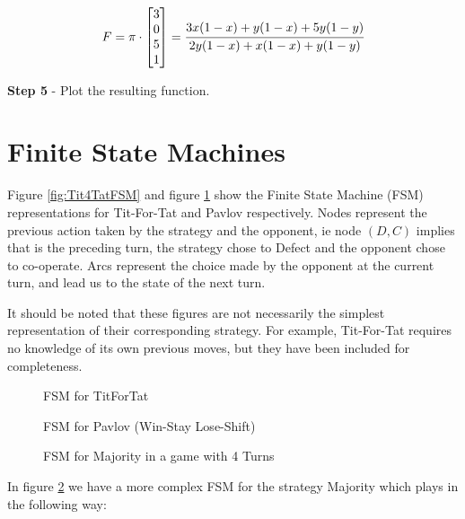 \begin{equation}
F = \pi \cdot
\begin{bmatrix}
3 \\
0 \\
5 \\
1
\end{bmatrix}
=
\cfrac{3x(1-x) + y(1-x) + 5y(1-y)}{2y(1-x) + x(1-x) + y(1-y)}
\end{equation}

\textbf{Step 5} - Plot the resulting function.

\section{Finite State Machines}

Figure \ref{fig:Tit4TatFSM} and figure \ref{fig:PavlovFSM} show the Finite State Machine (FSM) representations for Tit-For-Tat and Pavlov respectively.
Nodes represent the previous action taken by the strategy and the opponent, ie node $(D, C)$ implies that is the preceding turn, the strategy chose to Defect and the opponent chose to co-operate.
Arcs represent the choice made by the opponent at the current turn, and lead us to the state of the next turn.

It should be noted that these figures are not necessarily the simplest representation of their corresponding strategy.
For example, Tit-For-Tat requires no knowledge of its own previous moves, but they have been included for completeness.

\begin{figure}[!hbtp]
    \begin{center}
        
        \caption{FSM for TitForTat}\label{fig:Tit4TatFSM}
        
        \caption{FSM for Pavlov (Win-Stay Lose-Shift)}\label{fig:PavlovFSM}
    \end{center}
\end{figure}

\begin{figure}[!hbtp]
    \begin{center}
        
        \caption{FSM for Majority in a game with 4 Turns}\label{fig:MajorityFSM}
    \end{center}
\end{figure}

In figure \ref{fig:MajorityFSM} we have a more complex FSM for the strategy Majority which plays in the following way:

